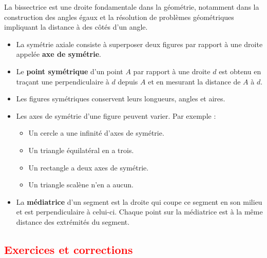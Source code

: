 \documentclass{article}
\begin{document}
\vspace{0.2cm}

La bissectrice est une droite fondamentale dans la géométrie, notamment dans la construction des angles égaux et la résolution de problèmes géométriques impliquant la distance à des côtés d'un angle.

\vspace{0.2cm}

\begin{tcolorbox}[colback=blue!10!white, colframe=blue!75!black, title=\textcolor{white}{Récapitulatif }, sharp corners=south]
    \begin{itemize}
        \item La symétrie axiale consiste à superposer deux figures par rapport à une droite appelée \textbf{axe de symétrie}.
        \item Le \textbf{point symétrique} d’un point \( A \) par rapport à une droite \( d \) est obtenu en traçant une perpendiculaire à \( d \) depuis \( A \) et en mesurant la distance de \( A \) à \( d \).
        \item Les figures symétriques conservent leurs longueurs, angles et aires.
        \item Les axes de symétrie d’une figure peuvent varier. Par exemple :
            \begin{itemize}
                \item Un cercle a une infinité d'axes de symétrie.
                \item Un triangle équilatéral en a trois.
                \item Un rectangle a deux axes de symétrie.
                \item Un triangle scalène n’en a aucun.
            \end{itemize}
        \item La \textbf{médiatrice} d’un segment est la droite qui coupe ce segment en son milieu et est perpendiculaire à celui-ci. Chaque point sur la médiatrice est à la même distance des extrémités du segment.
    \end{itemize}
\end{tcolorbox}

\subsection{\textcolor{red}{Exercices et corrections}}

\vspace{0.2cm}
\end{document}
